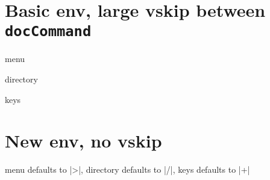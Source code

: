 \documentclass{article}
\begin{document}
\section{Basic env, large vskip between \texttt{docCommand}}
\begin{docCommand}[doc description=\oarg{input sep} defaults to |>|]
  {menu}
  {}
\end{docCommand}

\begin{docCommand}{directory}{}
\end{docCommand}

\begin{docCommand}{keys}{}
\end{docCommand}

\section{New env, no vskip}
\begin{docCommands}{
  {menu}
    {}
    { defaults to |>|},
  {directory}
    {}
    { defaults to |/|},
  {keys}
    {}
    { defaults to |+|}}
  \lipsum[1]
\end{docCommands}
\end{document}

